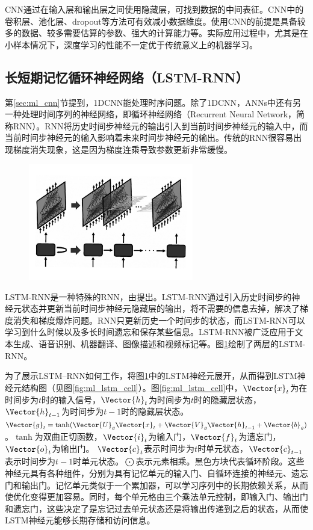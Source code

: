 CNN通过在输入层和输出层之间使用隐藏层，可找到数据的中间表征。CNN中的卷积层、池化层、dropout等方法可有效减小数据维度。使用CNN的前提是具备较多的数据、较多需要估算的参数、强大的计算能力等。实际应用过程中，尤其是在小样本情况下，深度学习的性能不一定优于传统意义上的机器学习。

\subsection{长短期记忆循环神经网络（LSTM-RNN）}\label{sec:ml_lstm}

第\ref{sec:ml_cnn}节提到，1DCNN能处理时序问题。除了1DCNN，ANNs中还有另一种处理时间序列的神经网络，即循环神经网络（Recurrent Neural Network，简称RNN）。RNN将历史时间步神经元的输出引入到当前时间步神经元的输入中，而当前时间步神经元的输入影响着未来时间步神经元的输出。传统的RNN很容易出现梯度消失现象，这是因为梯度连乘导致参数更新非常缓慢。

\begin{figure}[!htbp]
  \centering
  \noindent\includegraphics[width=72mm]{Img/chap2_ml/lstm_rnn}
  \label{fig:ml_lstm_rnn}
\end{figure}

LSTM-RNN是一种特殊的RNN，由\citet{hochreiter1997long}提出。LSTM-RNN通过引入历史时间步的神经元状态并更新当前时间步神经元隐藏层的输出，将不需要的信息去掉，解决了梯度消失和梯度爆炸问题。RNN只更新历史一个时间步的状态，而LSTM-RNN可以学习到什么时候以及多长时间遗忘和保存某些信息。LSTM-RNN被广泛应用于文本生成、语音识别、机器翻译、图像描述和视频标记等。图\ref{fig:ml_lstm_rnn}绘制了两层的LSTM-RNN。

为了展示LSTM–RNN如何工作，将图\ref{fig:ml_lstm_rnn}中的LSTM神经元展开，从而得到LSTM神经元结构图（见图\ref{fig:ml_lstm_cell}）。图\ref{fig:ml_lstm_cell}中，$\Vector{x}_t$为在时间步为$t$时的输入信号，$\Vector{h}_{t}$为时间步为$t$时的隐藏层状态，$\Vector{h}_{t-1}$为时间步为$t-1$时的隐藏层状态。$\Vector{g}_t=\tanh(\Vector{U}_g\Vector{x}_t+\Vector{V}_g\Vector{h}_{t-1}+\Vector{b}_g)$。$\tanh$为双曲正切函数，$\Vector{i}_t$为输入门，$\Vector{f}_t$为遗忘门，$\Vector{o}_t$为输出门。 $\Vector{c}_t$表示时间步为$t$时单元状态，$\Vector{c}_{t-1}$ 表示时间步为$t-1$时单元状态。$\bigodot$表示元素相乘。黑色方块代表循环阶段。这些神经元具有各种组件，分别为具有记忆单元的输入门、自循环连接的神经元、遗忘门和输出门。记忆单元类似于一个累加器，可以学习序列中的长期依赖关系，从而使优化变得更加容易。同时，每个单元格由三个乘法单元控制，即输入门、输出门和遗忘门，这些决定了是忘记过去单元状态还是将输出传递到之后的状态，从而使LSTM神经元能够长期存储和访问信息。

